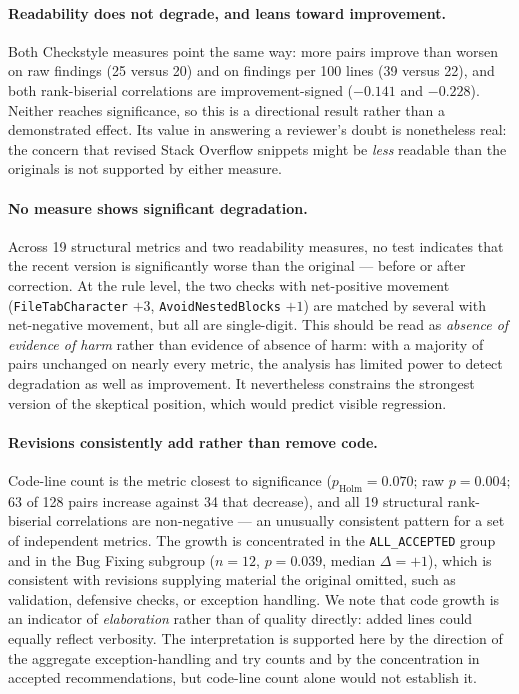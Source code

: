 \paragraph{Readability does not degrade, and leans toward improvement.}
Both Checkstyle measures point the same way: more pairs improve than worsen on raw findings (25 versus 20) and on findings per 100 lines (39 versus 22), and both rank-biserial correlations are improvement-signed ($-0.141$ and $-0.228$).
Neither reaches significance, so this is a directional result rather than a demonstrated effect.
Its value in answering a reviewer's doubt is nonetheless real: the concern that revised Stack Overflow snippets might be \emph{less} readable than the originals is not supported by either measure.

\paragraph{No measure shows significant degradation.}
Across 19 structural metrics and two readability measures, no test indicates that the recent version is significantly worse than the original --- before or after correction.
At the rule level, the two checks with net-positive movement (\texttt{FileTabCharacter} $+3$, \texttt{AvoidNestedBlocks} $+1$) are matched by several with net-negative movement, but all are single-digit.
This should be read as \emph{absence of evidence of harm} rather than evidence of absence of harm: with a majority of pairs unchanged on nearly every metric, the analysis has limited power to detect degradation as well as improvement.
It nevertheless constrains the strongest version of the skeptical position, which would predict visible regression.

\paragraph{Revisions consistently add rather than remove code.}
Code-line count is the metric closest to significance ($p_{\text{Holm}}=0.070$; raw $p=0.004$; 63 of 128 pairs increase against 34 that decrease), and all 19 structural rank-biserial correlations are non-negative --- an unusually consistent pattern for a set of independent metrics.
The growth is concentrated in the \texttt{ALL\_ACCEPTED} group and in the Bug Fixing subgroup ($n=12$, $p=0.039$, median $\Delta=+1$), which is consistent with revisions supplying material the original omitted, such as validation, defensive checks, or exception handling.
We note that code growth is an indicator of \emph{elaboration} rather than of quality directly: added lines could equally reflect verbosity.
The interpretation is supported here by the direction of the aggregate exception-handling and try counts and by the concentration in accepted recommendations, but code-line count alone would not establish it.

